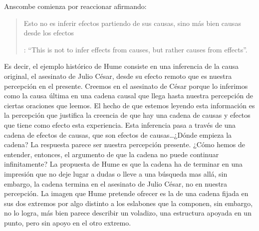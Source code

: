 Anscombe comienza por reaccionar afirmando: \blockquote[{\Cite[86]{anscombe1981parmenides:humeandjulius}}: \enquote{This is not to infer effects from causes, but rather causes from effects}.]{Esto no es inferir efectos partiendo de sus causas, sino más bien causas desde los efectos}. Es decir, el ejemplo histórico de Hume consiste en una inferencia de la causa original, el asesinato de Julio César, desde su efecto remoto que es nuestra percepción en el presente. Creemos en el asesinato de César porque lo inferimos como la causa última en una cadena causal que llega hasta nuestra percepción de ciertas oraciones que leemos. El hecho de que estemos leyendo esta información es la percepción que justifica la creencia de que hay una cadena de causas y efectos que tiene como efecto esta experiencia. Esta inferencia pasa a través de una cadena de efectos de causas, que son efectos de causas\ldots ¿Dónde empieza la cadena? La respuesta parece ser nuestra percepción presente. ¿Cómo hemos de entender, entonces, el argumento de que la cadena no puede continuar infinitamente? La propuesta de Hume es que la cadena ha de terminar en una impresión que no deje lugar a dudas o lleve a una búsqueda mas allá, sin embargo, la cadena termina en el asesinato de Julio César, no en nuestra percepción. La imagen que Hume pretende ofrecer es la de una cadena fijada en sus dos extremos por algo distinto a los eslabones que la componen, sin embargo, no lo logra, más bien parece describir un voladizo, una estructura apoyada en un punto, pero sin apoyo en el otro extremo.

